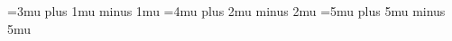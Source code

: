 


\thinmuskip=3mu plus 1mu minus 1mu       %
\medmuskip=4mu plus 2mu minus 2mu        %
\thickmuskip=5mu plus 5mu minus 5mu      %

\providecommand{\arcsec}{^{\prime\prime}}
\providecommand{\arcmin}{^{\prime}}

\usepackage{gensymb}

\usepackage{siunitx}


